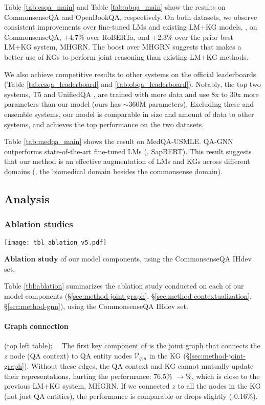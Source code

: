 Table \ref{tab:csqa_main} and Table \ref{tab:obqa_main} show the results on CommonsenseQA and OpenBookQA, respectively. On both datasets, we observe consistent improvements over fine-tuned LMs and existing LM+KG models, \eg, on CommonsenseQA, +4.7\% over RoBERTa, and +2.3\% over the prior best LM+KG system, MHGRN. 
The boost over MHGRN suggests that \methodname makes a better use of KGs to perform joint reasoning than existing LM+KG methods.

We also achieve competitive results to other systems on the official leaderboards (Table  \ref{tab:csqa_leaderboard} and \ref{tab:obqa_leaderboard}). Notably, the top two systems, T5 \cite{t5} and UnifiedQA \cite{khashabi2020unifiedqa}, are trained with more data and use 8x to 30x more parameters than our model (ours has $\sim$360M parameters).
Excluding these and ensemble systems, our model is comparable in size and amount of data to other systems, and achieves the top performance on the two datasets.


Table \ref{tab:medqa_main} shows the result on MedQA-USMLE. QA-GNN outperforms state-of-the-art fine-tuned LMs (\eg, SapBERT). This result suggests that our method is an effective augmentation of LMs and KGs across different domains (\ie, the biomedical domain besides the commonsense domain).



\subsection{Analysis}
\subsubsection{Ablation studies}
\label{sec:experiment-ablation}
\begin{table}[!t]
\hspace{-2mm}
\texttt{[image: tbl\_ablation\_v5.pdf]}
    \vspace{-7mm}
    \caption{\textbf{Ablation study} of our model components, using the CommonsenseQA IHdev set.}
\label{tbl:ablation}
\end{table}

Table \ref{tbl:ablation} summarizes the ablation study conducted on each of our model components (\S \ref{sec:method-joint-graph}, \S \ref{sec:method-contextualization}, \S \ref{sec:method-gnn}), using the CommonsenseQA IHdev set.

\paragraph{Graph connection}\!\!\!\!(top left table):~~ The first key component of \methodname is the joint graph that connects the $z$ node (QA context) to QA entity nodes $\mathcal{V}_{q,a}$ in the KG (\S \ref{sec:method-joint-graph}). Without these edges, the QA context and KG cannot mutually update their representations, hurting the performance: 76.5\% \!$\rightarrow$\%, which is close to the previous LM+KG system, MHGRN. 
If we connected $z$ to all the nodes in the KG (not just QA entities), the performance is comparable or drops slightly (-0.16\%).


